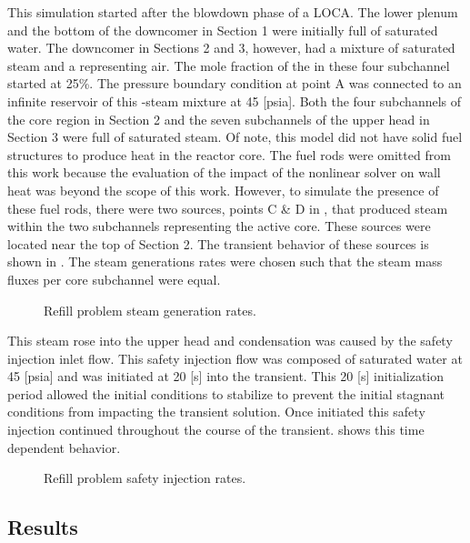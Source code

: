This simulation started after the blowdown phase of a LOCA.
The lower plenum and the bottom of the downcomer in Section 1 were initially full of saturated water.
The downcomer in Sections 2 and 3, however, had a mixture of saturated steam and a \ncg{} representing air.
The mole fraction of the \ncgs{} in these four subchannel started at 25\%.
The pressure boundary condition at point A was connected to an infinite reservoir of this \ncg{}-steam mixture at 45 [psia]. 
Both the four subchannels of the core region in Section 2 and the seven subchannels of the upper head in Section 3 were full of saturated steam.
Of note, this model did not have solid fuel structures to produce heat in the reactor core.
The fuel rods were omitted from this work because the evaluation of the impact of the nonlinear solver on wall heat was beyond the scope of this work.
However, to simulate the presence of these fuel rods, there were two sources, points C \& D in , that produced steam within the two subchannels representing the active core.
These sources were located near the top of Section 2.
The transient behavior of these sources is shown in .
The steam generations rates were chosen such that the steam mass fluxes per core subchannel were equal.

\begin{figure}[h!tb]
\centering

\caption{Refill problem steam generation rates.}
\label{fig:refillSteamRates}
\end{figure}

This steam rose into the upper head and condensation was caused by the safety injection inlet flow.
This safety injection flow was composed of saturated water at 45 [psia] and was initiated at 20 [s] into the transient.
This 20 [s] initialization period allowed the initial conditions to stabilize to prevent the initial stagnant conditions from impacting the transient solution.
Once initiated this safety injection continued throughout the course of the transient.
 shows this time dependent behavior.

\begin{figure}[h!tb]
\centering

\caption{Refill problem safety injection rates.}
\label{fig:refillSafetyInjection}
\end{figure}

\subsection{Results}
\label{sect:refillResults}

